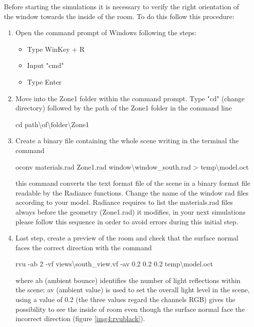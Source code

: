 Before starting the simulations it is necessary to verify the right orientation of the window towards the inside of the room.
To do this follow this procedure: 
\begin{enumerate}
\item Open the command prompt of Windows following the steps:
\begin{itemize}
\item Type WinKey + R
\item Input "cmd"
\item Type Enter
\end{itemize}
\item Move into the Zone1 folder within the command prompt. Type "cd" (change directory) followed by the path of the Zone1 folder  in the command line 
\begin{center}
cd path\textbackslash of\textbackslash folder\textbackslash Zone1
\end{center}

\item Create a binary file containing the whole scene writing in the terminal the command 
\begin{center}
oconv materials.rad Zone1.rad window\textbackslash window\_south.rad > temp\textbackslash model.oct
\end{center}
this command converts the text format file of the scene in a binary format file readable by the Radiance functions. Change the name of the window rad files according to your model. Radiance requires to list the materials.rad files always before the geometry (Zone1.rad) it modifies, in your next simulations please follow this sequence in order to avoid errors during this initial step.

\item  Last step, create a preview of the room and check that the surface normal faces the correct direction with the command 
\begin{center}
rvu -ab 2 -vf views\textbackslash south\_view.vf -av 0.2 0.2 0.2 temp\textbackslash model.oct
\end{center}
where ab (ambient bounce) identifies the number of light reflections within the scene; av (ambient value) is used to set the overall light level in the scene, using a value of 0.2 (the three values regard the channels RGB) gives the possibility to see the inside of room even though the surface normal face the incorrect direction (figure \ref{img4:rvublack}). 
\end{enumerate}

